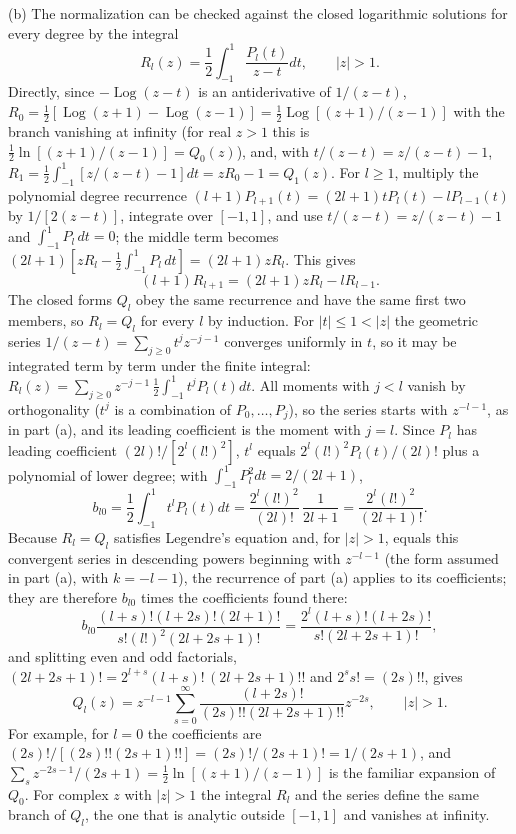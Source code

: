 (b) The normalization can be checked against the closed logarithmic
solutions for every degree by the integral
\[
R_l(z)=\frac12\int_{-1}^1\frac{P_l(t)}{z-t}dt,\qquad |z|>1.
\]
Directly, since $-\operatorname{Log}(z-t)$ is an antiderivative of
$1/(z-t)$,
$R_0=\tfrac12[\operatorname{Log}(z+1)-\operatorname{Log}(z-1)]
=\tfrac12\operatorname{Log}[(z+1)/(z-1)]$ with the branch
vanishing at infinity (for real $z>1$ this is
$\frac12\ln[(z+1)/(z-1)]=Q_0(z)$), and, with $t/(z-t)=z/(z-t)-1$,
$R_1=\frac12\int_{-1}^1[z/(z-t)-1]dt=zR_0-1=Q_1(z)$.
For $l\ge1$, multiply the polynomial degree recurrence
$(l+1)P_{l+1}(t)=(2l+1)tP_l(t)-lP_{l-1}(t)$ by
$1/[2(z-t)]$, integrate over $[-1,1]$, and use
$t/(z-t)=z/(z-t)-1$ and $\int_{-1}^1P_l\,dt=0$; the middle term
becomes $(2l+1)[zR_l-\frac12\int_{-1}^1P_l\,dt]=(2l+1)zR_l$. This gives
\[
(l+1)R_{l+1}=(2l+1)zR_l-lR_{l-1}.
\]
The closed forms $Q_l$ obey the same recurrence and have the same
first two members, so $R_l=Q_l$ for every $l$ by induction.
For $|t|\le1<|z|$ the geometric series
$1/(z-t)=\sum_{j\ge0}t^jz^{-j-1}$ converges uniformly in $t$, so it may
be integrated term by term under the finite integral:
$R_l(z)=\sum_{j\ge0}z^{-j-1}\,\frac12\int_{-1}^1t^jP_l(t)dt$.
All moments with $j<l$ vanish by orthogonality ($t^j$ is a combination
of $P_0,\ldots,P_j$), so the series starts with $z^{-l-1}$, as in part
(a), and its leading coefficient is the moment with $j=l$. Since $P_l$
has leading coefficient $(2l)!/[2^l(l!)^2]$, $t^l$ equals
$2^l(l!)^2P_l(t)/(2l)!$ plus a polynomial of lower degree; with
$\int_{-1}^1P_l^2dt=2/(2l+1)$,
\[
b_{l0}=\frac12\int_{-1}^1t^lP_l(t)dt
=\frac{2^l(l!)^2}{(2l)!}\,\frac1{2l+1}
=\boxed{\frac{2^l(l!)^2}{(2l+1)!}}.
\]
Because $R_l=Q_l$ satisfies Legendre's equation and, for $|z|>1$,
equals this convergent series in descending powers beginning with
$z^{-l-1}$ (the form assumed in part (a), with $k=-l-1$), the
recurrence of part (a) applies to its coefficients; they are therefore
$b_{l0}$ times the coefficients found there:
\[
b_{l0}\frac{(l+s)!(l+2s)!(2l+1)!}{s!(l!)^2(2l+2s+1)!}
=\frac{2^l(l+s)!(l+2s)!}{s!(2l+2s+1)!},
\]
and splitting even and odd factorials,
$(2l+2s+1)!=2^{l+s}(l+s)!\,(2l+2s+1)!!$ and $2^ss!=(2s)!!$, gives
\[
\boxed{Q_l(z)=z^{-l-1}\sum_{s=0}^\infty
\frac{(l+2s)!}{(2s)!!(2l+2s+1)!!}z^{-2s}},\qquad |z|>1.
\]
For example, for $l=0$ the coefficients are
$(2s)!/[(2s)!!(2s+1)!!]=(2s)!/(2s+1)!=1/(2s+1)$, and
$\sum_sz^{-2s-1}/(2s+1)=\frac12\ln[(z+1)/(z-1)]$ is the familiar
expansion of $Q_0$.
For complex $z$ with $|z|>1$ the integral $R_l$ and the series define
the same branch of $Q_l$, the one that is analytic outside $[-1,1]$ and
vanishes at infinity.

